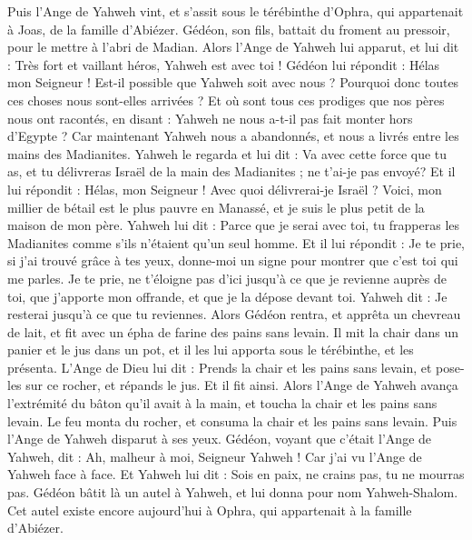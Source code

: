 \begin{multicols}{2}
Puis l'Ange de Yahweh vint, et s'assit sous le térébinthe d’Ophra, qui appartenait à Joas, de la famille d'Abiézer. Gédéon, son fils, battait du froment au pressoir, pour le mettre à l'abri de Madian.
Alors l'Ange de Yahweh lui apparut, et lui dit : Très fort et vaillant héros, Yahweh est avec toi !
Gédéon lui répondit : Hélas mon Seigneur ! Est-il possible que Yahweh soit avec nous ? Pourquoi donc toutes ces choses nous sont-elles arrivées ? Et où sont tous ces prodiges que nos pères nous ont racontés, en disant : Yahweh ne nous a-t-il pas fait monter hors d'Egypte ? Car maintenant Yahweh nous a abandonnés, et nous a livrés entre les mains des Madianites.
Yahweh le regarda et lui dit : Va avec cette force que tu as, et tu délivreras Israël de la main des Madianites ; ne t'ai-je pas envoyé?
Et il lui répondit : Hélas, mon Seigneur ! Avec quoi délivrerai-je Israël ? Voici, mon millier de bétail est le plus pauvre en Manassé, et je suis le plus petit de la maison de mon père.
Yahweh lui dit : Parce que je serai avec toi, tu frapperas les Madianites comme s'ils n'étaient qu'un seul homme.
Et il lui répondit : Je te prie, si j'ai trouvé grâce à tes yeux, donne-moi un signe pour montrer que c'est toi qui me parles.
Je te prie, ne t’éloigne pas d’ici jusqu'à ce que je revienne auprès de toi, que j'apporte mon offrande, et que je la dépose devant toi. Yahweh dit : Je resterai jusqu'à ce que tu reviennes.
Alors Gédéon rentra, et apprêta un chevreau de lait, et fit avec un épha de farine des pains sans levain. Il mit la chair dans un panier et le jus dans un pot, et il les lui apporta sous le térébinthe, et les présenta.
L'Ange de Dieu lui dit : Prends la chair et les pains sans levain, et pose-les sur ce rocher, et répands le jus. Et il fit ainsi.
Alors l'Ange de Yahweh avança l’extrémité du bâton qu'il avait à la main, et toucha la chair et les pains sans levain. Le feu monta du rocher, et consuma la chair et les pains sans levain. Puis l'Ange de Yahweh disparut à ses yeux.
Gédéon, voyant que c'était l'Ange de Yahweh, dit : Ah, malheur à moi, Seigneur Yahweh ! Car j'ai vu l’Ange de Yahweh face à face.
Et Yahweh lui dit : Sois en paix, ne crains pas, tu ne mourras pas.
Gédéon bâtit là un autel à Yahweh, et lui donna pour nom Yahweh-Shalom. Cet autel existe encore aujourd'hui à Ophra, qui appartenait à la famille d'Abiézer.

\end{multicols}

